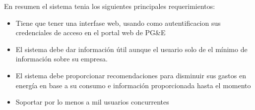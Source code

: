 \documentclass{article}
\begin{document}
En resumen el sistema tenia los siguientes principales requerimientos:
\begin{itemize}
\item Tiene que tener una interfase web, usando como autentificacion
  sus credenciales de acceso en el portal web de PG\&E
\item El sistema debe dar información útil aunque el usuario solo de
  el mínimo de información sobre su empresa.
\item El sistema debe proporcionar recomendaciones para disminuir sus
  gastos en energía en base a su consumo e información proporcionada
  hasta el momento
\item Soportar por lo menos a mil usuarios concurrentes
\end{itemize}
\end{document}
